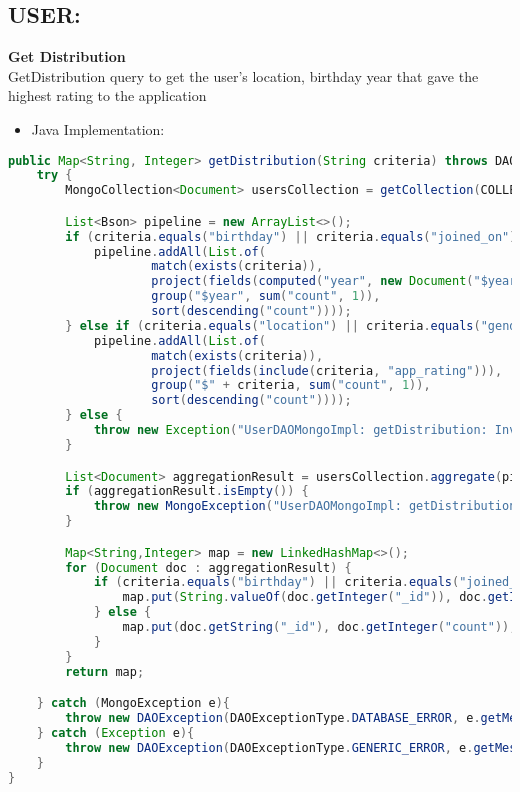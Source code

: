 \subsection*{USER:}
\textbf{Get Distribution}\\
GetDistribution query to get the user's location, birthday year that gave the highest rating to the application
\begin{itemize}
    \item Java Implementation:
\end{itemize}
\begin{mdframed}[style=customstyle]
\begin{lstlisting}[language=java]
public Map<String, Integer> getDistribution(String criteria) throws DAOException {
    try {
        MongoCollection<Document> usersCollection = getCollection(COLLECTION_NAME);

        List<Bson> pipeline = new ArrayList<>();
        if (criteria.equals("birthday") || criteria.equals("joined_on")) {
            pipeline.addAll(List.of(
                    match(exists(criteria)),
                    project(fields(computed("year", new Document("$year", "$" + criteria)), include("app_rating" ))),
                    group("$year", sum("count", 1)),
                    sort(descending("count"))));
        } else if (criteria.equals("location") || criteria.equals("gender")) {
            pipeline.addAll(List.of(
                    match(exists(criteria)),
                    project(fields(include(criteria, "app_rating"))),
                    group("$" + criteria, sum("count", 1)),
                    sort(descending("count"))));
        } else {
            throw new Exception("UserDAOMongoImpl: getDistribution: Invalid criteria");
        }

        List<Document> aggregationResult = usersCollection.aggregate(pipeline).into(new ArrayList<>());
        if (aggregationResult.isEmpty()) {
            throw new MongoException("UserDAOMongoImpl: getDistribution: No data found");
        }

        Map<String,Integer> map = new LinkedHashMap<>();
        for (Document doc : aggregationResult) {
            if (criteria.equals("birthday") || criteria.equals("joined_on")) {
                map.put(String.valueOf(doc.getInteger("_id")), doc.getInteger("count"));
            } else {
                map.put(doc.getString("_id"), doc.getInteger("count"));
            }
        }
        return map;

    } catch (MongoException e){
        throw new DAOException(DAOExceptionType.DATABASE_ERROR, e.getMessage());
    } catch (Exception e){
        throw new DAOException(DAOExceptionType.GENERIC_ERROR, e.getMessage());
    }
}\end{lstlisting}
\end{mdframed}

